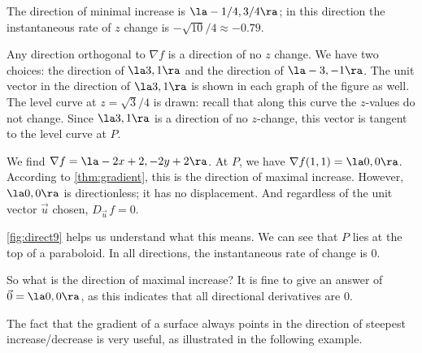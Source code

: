 {%

The direction of minimal increase is $\la -1/4,3/4\ra$; in this direction the instantaneous rate of $z$ change is $-\sqrt{10}/4 \approx -0.79$.

Any direction orthogonal to $\nabla f$ is a direction of no $z$ change. We have two choices: the direction of $\la 3,1\ra$ and the direction of $\la -3,-1\ra$. The unit vector in the direction of $\la 3,1\ra$ is shown in each graph of the figure as well. The level curve at $z=\sqrt{3}/4$ is drawn: recall that along this curve the $z$-values do not change. Since $\la 3,1\ra$ is a direction of no $z$-change, this vector is tangent to the level curve at $P$.}

{We find $\nabla f = \la -2x+2, -2y+2\ra$. At $P$, we have $\nabla f(1,1) = \la 0,0\ra$. 
According to \autoref{thm:gradient}, this is the direction of maximal increase. However, $\la 0,0\ra$ is directionless; it has no displacement. And regardless of the unit vector $\vec u$ chosen, $D_{\vec u\,}f = 0$.

\autoref{fig:direct9} helps us understand what this means. We can see that $P$ lies at the top of a paraboloid. In all directions, the instantaneous rate of change is 0. 

So what is the direction of maximal increase? It is fine to give an answer of $\vec 0 = \la 0,0\ra$, as this indicates that all directional derivatives are 0.
}

The fact that the gradient of a surface always points in the direction of steepest increase/decrease is very useful, as illustrated in the following example.\\

